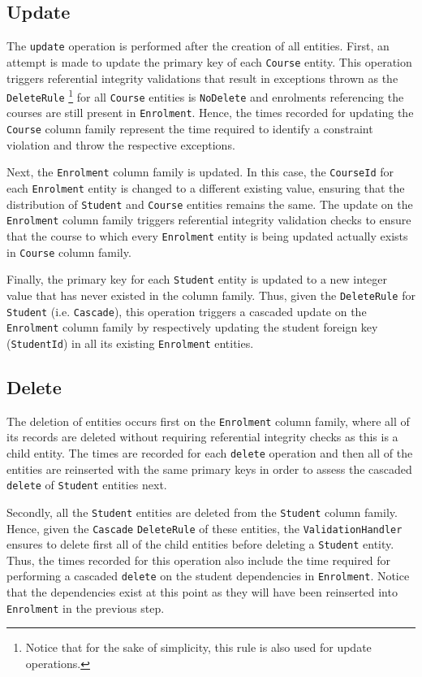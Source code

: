 \subsection{Update}
The \texttt{update} operation is performed after the creation of all entities.
First,  an attempt is made to update the primary key of each \texttt{Course}
entity.  This operation triggers referential integrity  validations that result
in exceptions thrown as the \texttt{DeleteRule} \footnote{Notice that for the
sake of simplicity, this rule is also used for  update operations.} for all
\texttt{Course} entities is \texttt{NoDelete} and enrolments referencing the
courses are still present in \texttt{Enrolment}. Hence, the times recorded for
updating the \texttt{Course} column family represent the time required to
identify a constraint violation and throw the respective exceptions.
					
Next,  the \texttt{Enrolment} column family is updated.  In this case,  the
\texttt{CourseId} for each \texttt{Enrolment} entity is changed to a different
existing value,  ensuring that the distribution of \texttt{Student} and
\texttt{Course} entities remains the same. The update on the \texttt{Enrolment}
column family triggers referential integrity validation checks to ensure that
the course to which every \texttt{Enrolment} entity is being updated actually
exists in \texttt{Course} column family. 
					
Finally,  the primary key for each \texttt{Student} entity is updated to a new
integer value that has never existed in the column family. Thus, given
the \texttt{DeleteRule} for \texttt{Student} (i.e. \texttt{Cascade}),  this
operation triggers a cascaded update on the \texttt{Enrolment} column family   
 by respectively updating the student foreign key (\texttt{StudentId}) in all
 its existing \texttt{Enrolment} entities.
		
\subsection{Delete} 
The deletion of entities occurs first on the
\texttt{Enrolment} column family,  where all of its records are deleted without
requiring referential integrity checks as this is a child entity.  The times are
recorded for each \texttt{delete} operation and then all of the entities are
reinserted with the same primary keys in order to assess the cascaded
\texttt{delete} of \texttt{Student} entities next. 
				
Secondly,  all  the \texttt{Student} entities are deleted from the
\texttt{Student} column family. Hence, given the \texttt{Cascade}
\texttt{DeleteRule} of these entities,  the \texttt{ValidationHandler} ensures
to delete first all of the child entities before deleting a \texttt{Student} entity. 
Thus,  the times recorded for this operation also include the time required for
performing a cascaded \texttt{delete} on the student dependencies in
\texttt{Enrolment}.
Notice that the dependencies exist at this point as they will have been reinserted into
\texttt{Enrolment} in the previous step. 
				
